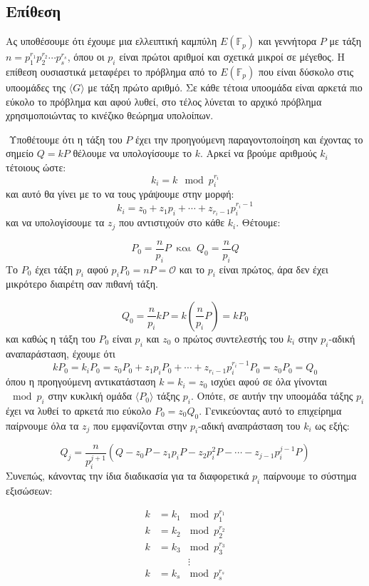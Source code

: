\documentclass[oneside,a4paper]{article}
\begin{document}
\vspace*{0.3cm}
\subsection{Επίθεση }

\vspace*{0.3cm}
Ας υποθέσουμε ότι έχουμε μια ελλειπτική καμπύλη $E(\mathbb{F}_p)$ και γεννήτορα $P$ με τάξη $n=p_1^{r_1} p_2^{r_2} \cdots p_s^{r_s}$, όπου οι $p_i$ είναι πρώτοι αριθμοί και σχετικά μικροί σε μέγεθος. Η επίθεση  ουσιαστικά μεταφέρει το πρόβλημα  από το $E(\mathbb{F}_p)$ που είναι δύσκολο στις υποομάδες της $\langle G \rangle$ με τάξη πρώτο αριθμό. Σε κάθε τέτοια υποομάδα είναι αρκετά πιο εύκολο το πρόβλημα και αφού λυθεί, στο τέλος λύνεται το αρχικό πρόβλημα χρησιμοποιώντας το κινέζικο θεώρημα υπολοίπων.

$ $\newline
Υποθέτουμε ότι η τάξη του $P$ έχει την προηγούμενη παραγοντοποίηση και έχοντας το σημείο $Q = kP$ θέλουμε να υπολογίσουμε το $k$. Αρκεί να βρούμε αριθμούς $k_i$ τέτοιους ώστε:
$$k_i =  k \mod p_i^{r_i}$$ και αυτό θα γίνει με το να τους γράψουμε στην μορφή:
$$k_i = z_0 + z_1 p_i + \cdots + z_{r_i -1} p_i^{r_i - 1}$$ και να υπολογίσουμε τα $z_j$ που αντιστιχούν στο κάθε $k_i$. Θέτουμε:

$$P_0 = \frac{n}{p_i}P \ \text{ και } \ Q_0 = \frac{n}{p_i} Q$$ Το $P_0$ έχει τάξη $p_i$ αφού $p_i P_0 = n P = \mathcal{O}$ και το $p_i$ είναι πρώτος, άρα δεν έχει μικρότερο διαιρέτη σαν πιθανή τάξη.

$$Q_0 = \frac{n}{p_i} kP = k\left( \frac{n}{p_i} P \right) = k P_0$$ και καθώς η τάξη του $P_0$ είναι $p_i$ και $z_0$ ο πρώτος συντελεστής του $k_i$ στην $p_i$-αδική αναπαράσταση, έχουμε ότι
$$k P_0 = k_i P_0 =  z_0 P_0 + z_1 p_i P_0 + \cdots + z_{r_i-1}p_i^{r_i-1}P_0 = z_0 P_0 = Q_0$$ όπου η προηγούμενη αντικατάσταση $k = k_i = z_0$ ισχύει αφού σε όλα γίνονται $\mod p_i$ στην κυκλική ομάδα $\langle P_0 \rangle$ τάξης $p_i$. Οπότε, σε αυτήν την υποομάδα τάξης $p_i$ έχει να λυθεί το αρκετά πιο εύκολο  $P_0 = z_0 Q_0$. Γενικεύοντας αυτό το επιχείρημα παίρνουμε όλα τα $z_j$ που εμφανίζονται στην $p_i$-αδική αναπράσταση του $k_i$ ως εξής:

$$Q_j = \frac{n}{p_i^{j+1}}\left(Q - z_0 P - z_1 p_i P - z_2 p_i^2 P - \cdots - z_{j-1} p_i^{j-1} P\right)$$ Συνεπώς, κάνοντας την ίδια διαδικασία για τα διαφορετικά $p_i$ παίρνουμε το σύστημα εξισώσεων:

\begin{align*}
	k &= k_1 \ \mod p_1^{r_1} \\
	k &= k_2 \ \mod p_2^{r_2} \\
	k &= k_3 \ \mod p_3^{r_3} \\
	& \quad  \quad \quad \vdots  \\
	k &= k_s \ \mod p_s^{r_s} 
\end{align*}
\end{document}
